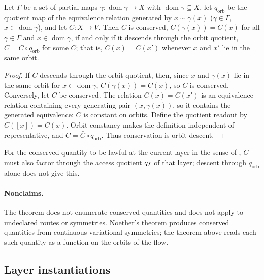 \begin{theorem}\label{thm:F27}
Let \(\Gamma\) be a set of partial maps \(\gamma:\operatorname{dom}\gamma\to X\)
with \(\operatorname{dom}\gamma\subseteq X\), let \(q_{\mathrm{orb}}\) be the
quotient map of the equivalence relation generated by \(x\sim\gamma(x)\)
(\(\gamma\in\Gamma\), \(x\in\operatorname{dom}\gamma\)), and let \(C:X\to V\).
Then \(C\) is conserved, \(C(\gamma(x))=C(x)\) for all \(\gamma\in\Gamma\) and
\(x\in\operatorname{dom}\gamma\), if and only if it descends through the orbit
quotient, \(C=\bar C\circ q_{\mathrm{orb}}\) for some \(\bar C\); that is,
\(C(x)=C(x')\) whenever \(x\) and \(x'\) lie in the same orbit.
\end{theorem}
\begin{proof}
If \(C\) descends through the orbit quotient, then, since \(x\) and
\(\gamma(x)\) lie in the same orbit for \(x\in\operatorname{dom}\gamma\), \(C(\gamma(x))=C(x)\), so \(C\) is
conserved.  Conversely, let \(C\) be conserved. The relation
\(C(x)=C(x')\) is an equivalence relation containing every generating pair
\((x,\gamma(x))\), so it contains the generated equivalence: \(C\) is constant
on orbits.  Define the quotient readout by \(\bar C([x])=C(x)\).  Orbit constancy
makes the definition independent of representative, and
\(C=\bar C\circ q_{\mathrm{orb}}\).  Thus conservation is orbit
descent.
\end{proof}

For the conserved quantity to be lawful at the current layer in the sense of , \(C\) must also factor through the access quotient \(q_I\) of that layer; descent through \(q_{\mathrm{orb}}\) alone does not give this.

\paragraph{Nonclaims.} The theorem does not enumerate conserved quantities and does not
apply to undeclared routes or symmetries.  Noether's theorem
\citep{Noether1918Invariante} produces conserved quantities from continuous
variational symmetries; the theorem above reads each such quantity as a
function on the orbits of the flow.

\subsection*{Layer instantiations}\label{layer-inst:F27}

